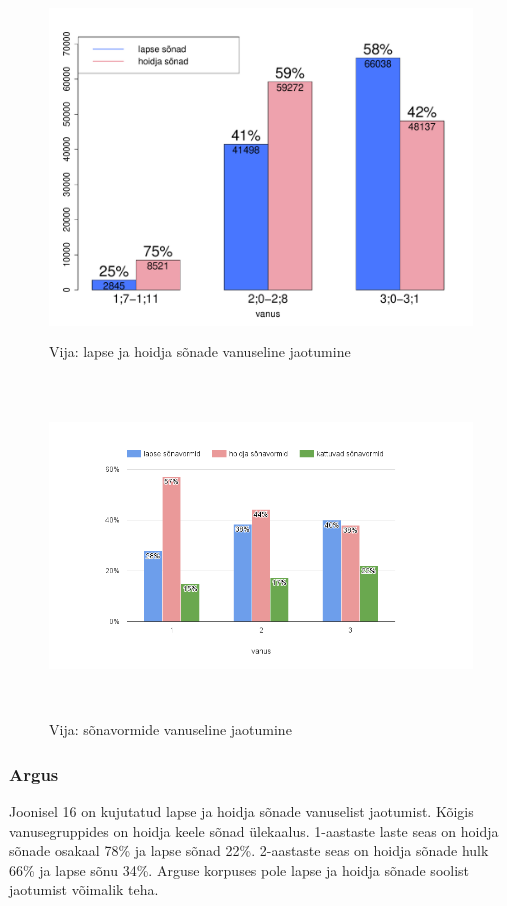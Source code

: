 \documentclass[12pt]{article}
\begin{document}
\begin{figure}[H]
    \centering
    \includegraphics[width=12cm, height=9cm]{vija_vanus_sonad}
    \caption{Vija: lapse ja hoidja sõnade vanuseline jaotumine}
\end{figure}


\begin{figure}[H]
    \centering
    \includegraphics[width=13cm, height=9cm]{vija_vanus_vormid}
    \caption{Vija: sõnavormide vanuseline jaotumine}
\end{figure}



\subsubsection{Argus}

Joonisel 16 on kujutatud lapse ja hoidja sõnade vanuselist jaotumist. Kõigis vanusegruppides on hoidja keele sõnad ülekaalus. 1-aastaste laste seas on hoidja sõnade osakaal 78\% ja lapse sõnad 22\%. 2-aastaste seas on hoidja sõnade hulk 66\% ja lapse sõnu 34\%. Arguse korpuses pole lapse ja hoidja sõnade soolist jaotumist võimalik teha.
\end{document}
